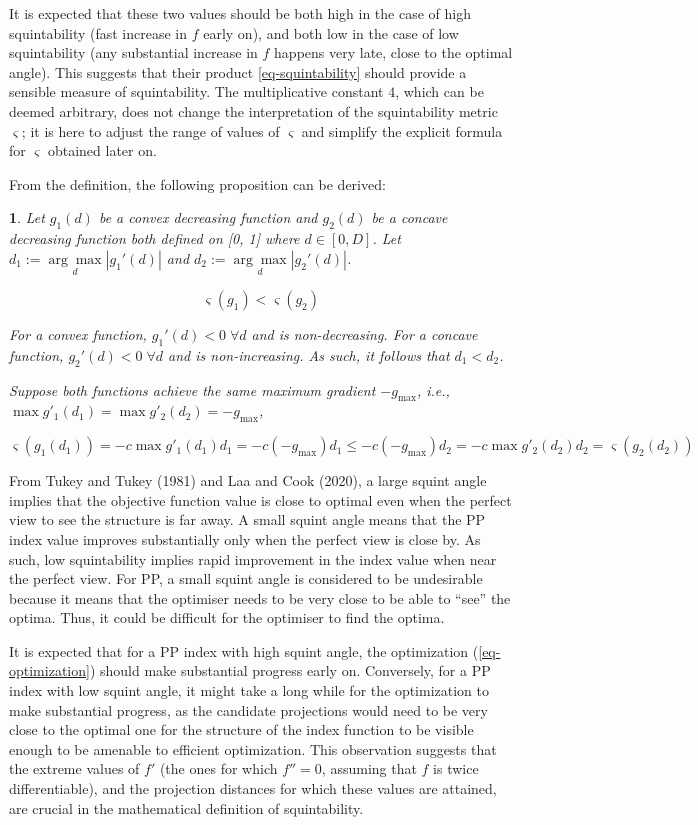 \documentclass[
  12pt,
]{interact}
\theoremstyle{plain}
\newtheorem{prop}{\protect\propositionname}
\providecommand{\propositionname}{Proposition}
\begin{document}
It is expected that these two values should be both high in the case of
high squintability (fast increase in \(f\) early on), and both low in
the case of low squintability (any substantial increase in \(f\) happens
very late, close to the optimal angle). This suggests that their product
\eqref{eq-squintability} should provide a sensible measure of
squintability. The multiplicative constant \(4\), which can be deemed
arbitrary, does not change the interpretation of the squintability
metric \(\varsigma\); it is here to adjust the range of values of
\(\varsigma\) and simplify the explicit formula for \(\varsigma\)
obtained later on.

From the definition, the following proposition can be derived:

\begin{prop}\label{prop:convex-concave}
Let $g_1(d)$ be a convex decreasing function and $g_2(d)$ be a concave decreasing function both defined on [0, 1] where $d \in [0, D]$. Let $d_1 := \underset{d}{\arg \max} |g_1'(d)|$ and $d_2 := \underset{d}{\arg \max} |g_2'(d)|$.

$$\varsigma(g_1) < \varsigma(g_2)$$

For a convex function, $g_1'(d) < 0 \; \forall d$ and is non-decreasing. For a concave function, $g_2'(d) < 0 \; \forall d$ and is non-increasing. As such, it follows that $d_1 < d_2$.

Suppose both functions achieve the same maximum gradient $-g_{\max}$, i.e., $\max g'_1(d_1) = \max g'_2(d_2) = -g_{\max}$,

$$
\varsigma(g_1(d_1)) = -c  \max g'_1(d_1)  d_1 = -c  (-g_{\max}) d_1 \leq -c  (-g_{\max}) d_2 = -c \max g'_2(d_2)  d_2 = \varsigma(g_2(d_2))
$$

\end{prop}

From Tukey and Tukey (1981) and Laa and Cook (2020), a large squint
angle implies that the objective function value is close to optimal even
when the perfect view to see the structure is far away. A small squint
angle means that the PP index value improves substantially only when the
perfect view is close by. As such, low squintability implies rapid
improvement in the index value when near the perfect view. For PP, a
small squint angle is considered to be undesirable because it means that
the optimiser needs to be very close to be able to ``see'' the optima.
Thus, it could be difficult for the optimiser to find the optima.

It is expected that for a PP index with high squint angle, the
optimization (\ref{eq-optimization}) should make substantial progress
early on. Conversely, for a PP index with low squint angle, it might
take a long while for the optimization to make substantial progress, as
the candidate projections would need to be very close to the optimal one
for the structure of the index function to be visible enough to be
amenable to efficient optimization. This observation suggests that the
extreme values of \(f'\) (the ones for which \(f''=0\), assuming that
\(f\) is twice differentiable), and the projection distances for which
these values are attained, are crucial in the mathematical definition of
squintability.
\end{document}
